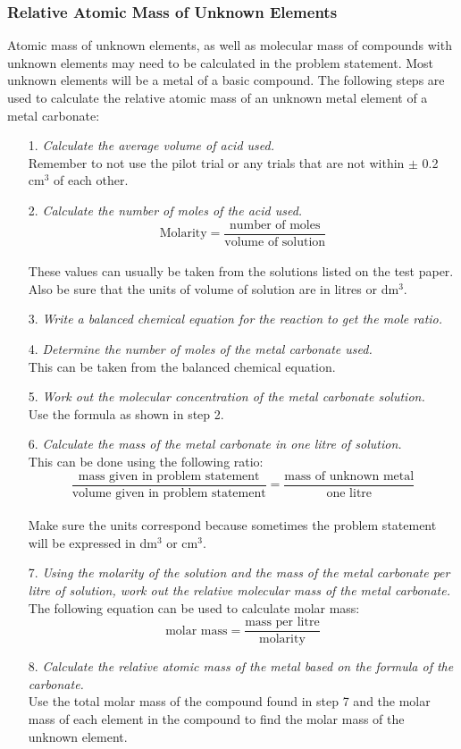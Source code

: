 \subsubsection{Relative Atomic Mass of Unknown Elements}

Atomic mass of unknown elements, as well as molecular mass of compounds with unknown elements may need to be calculated in the problem statement. Most unknown elements will be a metal of a basic compound. The following steps are used to calculate the relative atomic mass of an unknown metal element of a metal carbonate:

\begin{enumerate}
\item[1.] \textit{Calculate the average volume of acid used.}\\
Remember to not use the pilot trial or any trials that are not within $\pm$ 0.2 cm$^3$ of each other.
\item[2.] \textit{Calculate the number of moles of the acid used.}\\
$$\text{Molarity} = \frac{\text{number of moles}}{\text{volume of solution}}$$\\
These values can usually be taken from the solutions listed on the test paper. Also be sure that the units of volume of solution are in litres or dm$^3$.
\item[3.] \textit{Write a balanced chemical equation for the reaction to get the mole ratio.}
\item[4.] \textit{Determine the number of moles of the metal carbonate used.}\\
This can be taken from the balanced chemical equation.
\item[5.] \textit{Work out the molecular concentration of the metal carbonate solution.}\\
Use the formula as shown in step 2.
\item[6.] \textit{Calculate the mass of the metal carbonate in one litre of solution.}\\
This can be done using the following ratio:\\
$$\frac{\text{mass given in problem statement}}{\text{volume given in problem statement}} = \frac{\text{mass of unknown metal}}{\text{one litre}}$$\\
Make sure the units correspond because sometimes the problem statement will be expressed in dm$^3$ or cm$^3$.
\item[7.] \textit{Using the molarity of the solution and the mass of the metal carbonate per litre of solution, work out the relative molecular mass of the metal carbonate.}\\
The following equation can be used to calculate molar mass:\\
$$\text{molar mass} = \frac{\text{mass per litre}}{\text{molarity}}$$
\item[8.] \textit{Calculate the relative atomic mass of the metal based on the formula of the carbonate.}\\
Use the total molar mass of the compound found in step 7 and the molar mass of each element in the compound to find the molar mass of the unknown element.
\end{enumerate}
